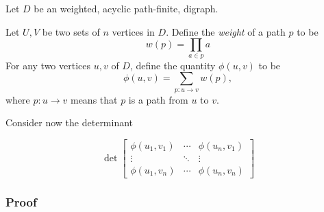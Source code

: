 \documentclass{article}
\begin{document}
\begin{theorem} 
    Let $D$ be an weighted, acyclic path-finite, digraph.

    Let $U, V$ be two sets of $n$ vertices in $D$. Define the \textit{weight} of a path $p$ to be 
    \[
        w(p) = \prod_{a \in p} a
    \]
    For any two vertices $u, v$ of $D$, define the quantity $\phi(u, v)$ to be
    \[
        \phi(u,v) = \sum_{p:u \rightarrow v} w(p),
    \]
    where $p: u \rightarrow v$ means that $p$ is a path from $u$ to $v$.

    Consider now the determinant 

    \[
        \det \begin{bmatrix}
            \phi(u_1, v_1) & \cdots & \phi(u_n, v_1) \\
             \vdots & \ddots & \vdots \\
            \phi(u_1, v_n) & \cdots & \phi(u_n, v_n)
        \end{bmatrix}
    \]

\end{theorem}

\subsubsection{Proof}
\end{document}
